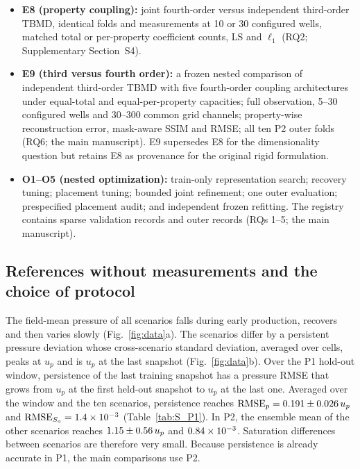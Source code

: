 \begin{itemize}
\item \textbf{E8 (property coupling):} joint fourth-order versus independent third-order TBMD, identical folds and measurements at 10 or 30 configured wells, matched total or per-property coefficient counts, LS and $\ell_1$ (RQ2; Supplementary Section~S4).
\item \textbf{E9 (third versus fourth order):} a frozen nested comparison of independent third-order TBMD with five fourth-order coupling architectures under equal-total and equal-per-property capacities; full observation, 5--30 configured wells and 30--300 common grid channels; property-wise reconstruction error, mask-aware SSIM and RMSE; all ten P2 outer folds (RQ6; the main manuscript). E9 supersedes E8 for the dimensionality question but retains E8 as provenance for the original rigid formulation.
\item \textbf{O1--O5 (nested optimization):} train-only representation search; recovery tuning; placement tuning; bounded joint refinement; one outer evaluation; prespecified placement audit; and independent frozen refitting. The registry contains \OptValidationRecords{} sparse validation records and \OptOuterRecords{} outer records (RQs 1--5; the main manuscript).
\end{itemize}


\subsection{References without measurements and the choice of protocol}
\label{sec:res_protocol}
The field-mean pressure of all scenarios falls during early production, recovers and then varies slowly (Fig.~\ref{fig:data}a). The scenarios differ by a persistent pressure deviation whose cross-scenario standard deviation, averaged over cells, peaks at \CrossSdMax{} $u_p$ and is \CrossSdEnd{} $u_p$ at the last snapshot (Fig.~\ref{fig:data}b). Over the P1 hold-out window, persistence of the last training snapshot has a pressure RMSE that grows from \PersistFirst{} $u_p$ at the first held-out snapshot to \PersistLast{} $u_p$ at the last one. Averaged over the window and the ten scenarios, persistence reaches $\mathrm{RMSE}_p=0.191\pm0.026\,u_p$ and $\mathrm{RMSE}_{S_o}=1.4\times10^{-3}$ (Table~\ref{tab:S_P1}). In P2, the ensemble mean of the other scenarios reaches $1.15\pm0.56\,u_p$ and $0.84\times10^{-3}$. Saturation differences between scenarios are therefore very small. Because persistence is already accurate in P1, the main comparisons use P2.

